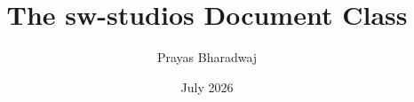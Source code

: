 \documentclass{sw-studios}
\title{The sw-studios Document Class}
\author{Prayas Bharadwaj}
\date{July 2026}
\begin{document}
\maketitle
\swtoc




\end{document}
